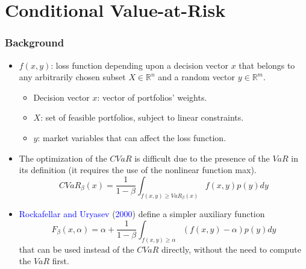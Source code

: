 \documentclass[pdf,10pt,xcolor=dvipsnames,hide notes]{beamer}
\begin{document}
\section{Conditional Value-at-Risk}
\begin{frame}[label=frame2b3]
	\frametitle{Background}
	\begin{itemize}
		\justifying
		\setlength{\parskip}{15pt}
		
		\item<1> $f\left( x,y\right)$: loss function depending upon a decision
		vector $x$ that belongs to any arbitrarily chosen subset $X\in
		\mathbb{R}
		^{n}$ and a random vector $y\in
		\mathbb{R}
		^{m}$. 
		
		\setlength{\parskip}{0pt}
		\begin{itemize}
			\item Decision vector $x$:		vector of portfolios' weights.
			\item $X$: set of feasible portfolios, subject to linear constraints.
			\item $y$: market variables that can affect the loss function.
		\end{itemize}
	
	\setlength{\parskip}{15pt}
	
	\item<2> %
	 The optimization of the $CVaR$ is difficult due to the presence of the $VaR$
	in its definition (it requires the use of the nonlinear function max).
	\begin{equation}
	CVaR_{\beta }\left( x\right) = \frac{1}{1-\beta }\int_{f(x,y)\geq VaR_{\beta
		}\left( x\right) }f(x,y)p(y)dy
	\end{equation}
	
	\item<2> %
	\textcolor{blue}{Rockafellar and Uryasev} (\textcolor{blue}{2000}) define a simpler auxiliary function
	\begin{equation}
	F_{\beta }\left( x,\alpha \right) = \alpha +\frac{1}{1-\beta }%
	\int_{f(x,y)\geq \alpha }\left( f(x,y)-\alpha \right) p(y)dy
	\label{six}
	\end{equation}%
	that can be used instead of the $CVaR$ directly, without the need to compute the $VaR$ first. %
	
	\end{itemize}
	
\end{frame}
\end{document}
